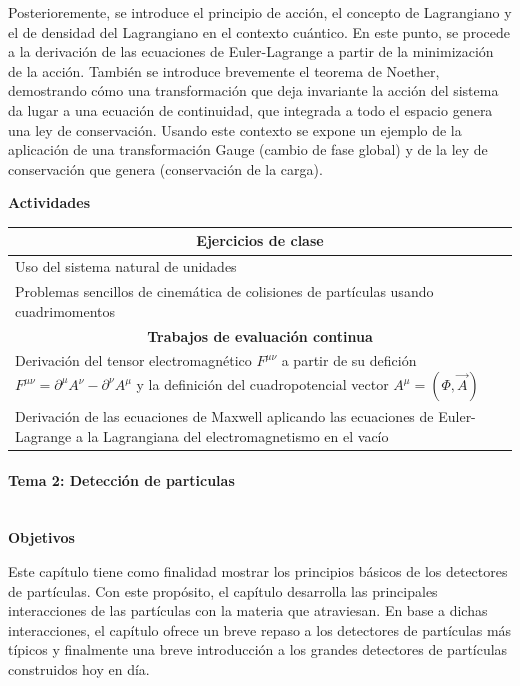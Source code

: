 Posterioremente, se introduce el principio de acción, el concepto de Lagrangiano y el de densidad del Lagrangiano en el contexto cuántico. En este punto, se procede a la derivación de las ecuaciones de Euler-Lagrange a partir de la minimización de la acción. También se introduce brevemente el teorema de Noether, demostrando cómo una transformación que deja invariante la acción del sistema da lugar a una ecuación de continuidad, que integrada a todo el espacio genera una ley de conservación. Usando este contexto se expone un ejemplo de la aplicación de una transformación Gauge (cambio de fase global) y de la ley de conservación que genera (conservación de la carga). 

\textbf{Actividades}

\begin{center}
\begin{tabularx}{\textwidth}{|X|}
\hline\hline
\multicolumn{1}{|c|}{\textbf{Ejercicios de clase}}\\
\hline\hline
Uso del sistema natural de unidades \\
\hline
Problemas sencillos de cinemática de colisiones de partículas usando cuadrimomentos \\
\hline\hline
\multicolumn{1}{|c|}{\textbf{Trabajos de evaluación continua}}\\
\hline\hline
Derivación del tensor electromagnético $F^{\mu\nu}$ a partir de su defición $F^{\mu\nu}=\partial^{\mu}A^{\nu}-\partial^{\nu}A^{\mu}$ y la definición del cuadropotencial vector $A^{\mu}=(\Phi, \vec{A})$ \\
\hline
Derivación de las ecuaciones de Maxwell aplicando las ecuaciones de Euler-Lagrange a la Lagrangiana del electromagnetismo en el vacío \\
\hline\hline
\end{tabularx}
\end{center}

\paragraph{Tema 2: Detección de particulas\\\\}

\textbf{Objetivos}

Este capítulo tiene como finalidad mostrar los principios básicos de los detectores de partículas. Con este propósito, el capítulo desarrolla las principales interacciones de las partículas con la materia que atraviesan. En base a dichas interacciones, el capítulo ofrece un breve repaso a los detectores de partículas más típicos y finalmente una breve introducción a los grandes detectores de partículas construidos hoy en día.

